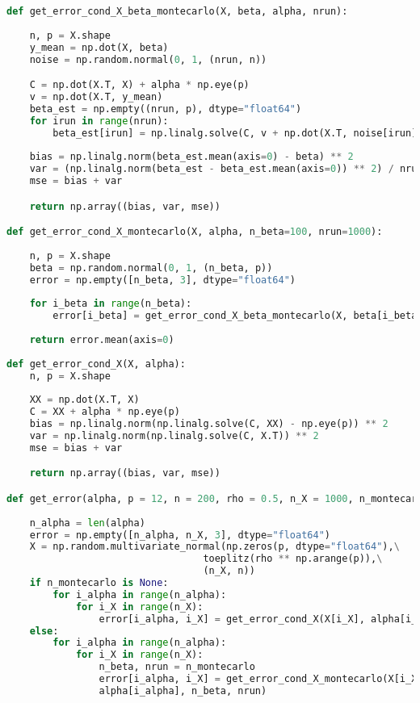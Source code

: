 \documentclass{article}
\begin{document}
\begin{lstlisting}[language=Python]
def get_error_cond_X_beta_montecarlo(X, beta, alpha, nrun):
    
    n, p = X.shape
    y_mean = np.dot(X, beta)
    noise = np.random.normal(0, 1, (nrun, n))

    C = np.dot(X.T, X) + alpha * np.eye(p)
    v = np.dot(X.T, y_mean)
    beta_est = np.empty((nrun, p), dtype="float64")
    for irun in range(nrun):
        beta_est[irun] = np.linalg.solve(C, v + np.dot(X.T, noise[irun]))
                                                             
    bias = np.linalg.norm(beta_est.mean(axis=0) - beta) ** 2
    var = (np.linalg.norm(beta_est - beta_est.mean(axis=0)) ** 2) / nrun
    mse = bias + var

    return np.array((bias, var, mse))

def get_error_cond_X_montecarlo(X, alpha, n_beta=100, nrun=1000):
    
    n, p = X.shape
    beta = np.random.normal(0, 1, (n_beta, p))
    error = np.empty([n_beta, 3], dtype="float64")
    
    for i_beta in range(n_beta):
        error[i_beta] = get_error_cond_X_beta_montecarlo(X, beta[i_beta], alpha, nrun)
        
    return error.mean(axis=0)
    
def get_error_cond_X(X, alpha):
    n, p = X.shape
    
    XX = np.dot(X.T, X)
    C = XX + alpha * np.eye(p)
    bias = np.linalg.norm(np.linalg.solve(C, XX) - np.eye(p)) ** 2
    var = np.linalg.norm(np.linalg.solve(C, X.T)) ** 2
    mse = bias + var

    return np.array((bias, var, mse))

def get_error(alpha, p = 12, n = 200, rho = 0.5, n_X = 1000, n_montecarlo = None):
    
    n_alpha = len(alpha)
    error = np.empty([n_alpha, n_X, 3], dtype="float64")
    X = np.random.multivariate_normal(np.zeros(p, dtype="float64"),\
                                  toeplitz(rho ** np.arange(p)),\
                                  (n_X, n))
    if n_montecarlo is None:
        for i_alpha in range(n_alpha):
            for i_X in range(n_X):
                error[i_alpha, i_X] = get_error_cond_X(X[i_X], alpha[i_alpha])
    else:
        for i_alpha in range(n_alpha):
            for i_X in range(n_X):
                n_beta, nrun = n_montecarlo
                error[i_alpha, i_X] = get_error_cond_X_montecarlo(X[i_X],\
                alpha[i_alpha], n_beta, nrun)
        

\end{lstlisting}
\end{document}
